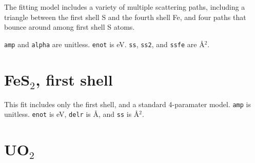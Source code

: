 \documentclass{article}
\let\stdsection\section
\renewcommand\section{\newpage\stdsection}
\begin{document}
The fitting model includes a variety of multiple scattering paths,
including a triangle between the first shell S and the fourth shell
Fe, and four paths that bounce around among first shell S atoms.

\texttt{amp} and \texttt{alpha} are unitless.  \texttt{enot} is eV.
\texttt{ss}, \texttt{ss2}, and \texttt{ssfe} are \AA$^2$.

\renewcommand{\feffmaterial}{FeS2}
\renewcommand{\feffrone}{3}
\renewcommand{\feffrtwo}{3.6}
\renewcommand{\feffrthree}{4}
\renewcommand{\feffrfour}{5.3}
\renewcommand{\feffrfive}{5.5}
\renewcommand{\fefffirst}{}

\small

\fitplots




\section{FeS$_2$, first shell}

\normalsize
This fit includes only the first shell, and a standard 4-paramater
model.  \texttt{amp} is unitless.  \texttt{enot} is eV, \texttt{delr}
is \AA, and \texttt{ss} is \AA$^2$.


\renewcommand{\fefffirst}{_1st}

\small

\fitplots






\section{UO$_2$}
\normalsize
\end{document}

